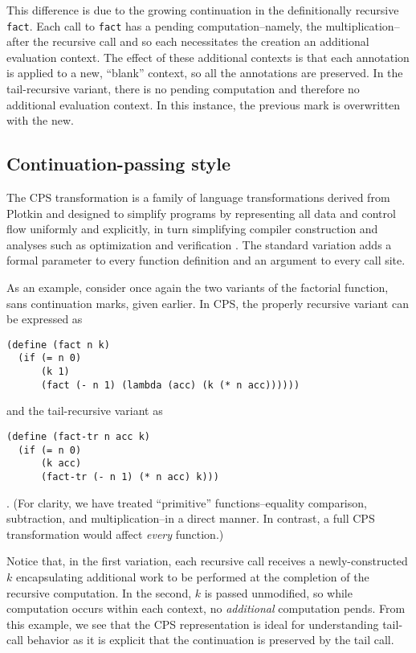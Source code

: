 \documentclass[ms]{byuprop}
\newcounter{definition}
\newcounter{example}
\begin{document}
This difference is due to the growing continuation in the definitionally recursive
\texttt{fact}. Each call to \texttt{fact} has a pending computation--namely, the
multiplication--after the recursive call and so each necessitates the creation an
additional evaluation context. The effect of these additional contexts is that each
annotation is applied to a new, ``blank'' context, so all the annotations are preserved. 
In the tail-recursive variant, there is no pending computation and therefore no additional
evaluation context. In this instance, the previous mark is overwritten with the new.

\subsection{Continuation-passing style}

The CPS transformation is a family of language transformations derived from Plotkin \cite{plotkin1975call} and designed to simplify  programs by representing all data and control flow uniformly and explicitly, in turn simplifying compiler construction and analyses such as optimization and verification \cite{sabry1994formal}. The standard variation adds a formal parameter to every function definition and an argument to every call site.

As an example, consider once again the two variants of the factorial function, sans continuation 
marks, given earlier. In CPS, the properly recursive variant can be expressed as
\begin{verbatim}
(define (fact n k) 
  (if (= n 0)
      (k 1)
      (fact (- n 1) (lambda (acc) (k (* n acc))))))
\end{verbatim}
and the tail-recursive variant as
\begin{verbatim}
(define (fact-tr n acc k)
  (if (= n 0)
      (k acc)
      (fact-tr (- n 1) (* n acc) k)))
\end{verbatim}. (For clarity, we have treated ``primitive'' functions--equality 
comparison, subtraction, and multiplication--in a direct manner. In contrast, a 
full CPS transformation would affect \emph{every} function.)

Notice that, in the first variation, each recursive call receives a newly-constructed 
$k$ encapsulating additional work to be performed at the completion of the recursive 
computation. In the second, $k$ is passed unmodified, so while computation occurs 
within each context, no \emph{additional} computation pends. From this example, we 
see that the CPS representation is ideal for understanding tail-call behavior as it 
is explicit that the continuation is preserved by the tail call.
\end{document}
